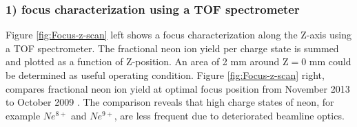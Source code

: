 \subsubsection{1) focus characterization using a TOF spectrometer}
Figure \ref{fig:Focus-z-scan} left shows a focus characterization along the Z-axis using a TOF spectrometer. The fractional neon ion yield per charge state is summed and plotted as a function of Z-position. An area of 2 mm around $\text{Z}=0$ mm could be determined as useful operating condition. Figure \ref{fig:Focus-z-scan} right, compares fractional neon ion yield at optimal focus position from November 2013 \citep{Bucher-2016-Unpublished} to October 2009 \citep{Doumy-2011-PRL}. The comparison reveals that high charge states of neon, for example $Ne^{8+}$ and $Ne^{9+}$, are less frequent due to deteriorated beamline optics.\\
